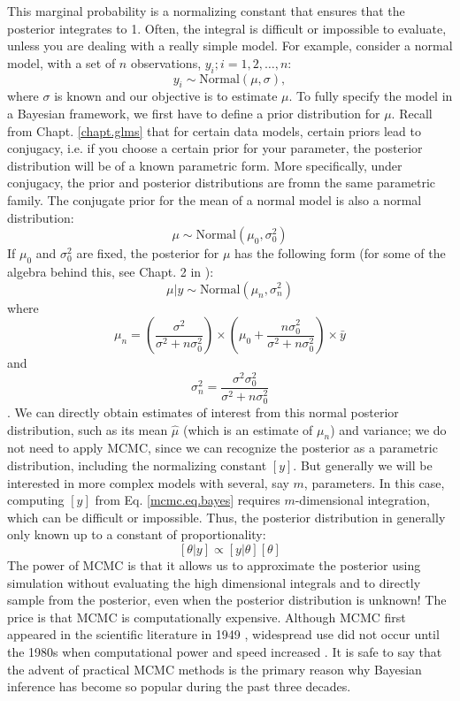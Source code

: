 This marginal probability is a normalizing constant that ensures that
the posterior integrates to 1. Often, the
integral is difficult or impossible to evaluate, unless you are
dealing with a really simple model.  For example, consider
a normal model, with a set of $n$ observations, $y_{i};
i=1,2,\ldots,n$:
\[
 y_{i} \sim \mbox{Normal}(\mu, \sigma),
\]
where $\sigma$ is known and our objective is to estimate
$\mu$. To fully specify the model in a Bayesian
framework, we first have to define a prior distribution for $\mu$. Recall
from Chapt. \ref{chapt.glms}
that for certain data models, certain priors lead to
conjugacy, i.e. if you choose a certain prior for your parameter,
the posterior distribution will be of a known parametric form. More specifically, under conjugacy, the prior and posterior distributions are fromn the same parametric family. The
conjugate prior for the mean of a normal model is also a normal
distribution:
\[
\mu \sim \mbox{Normal}(\mu_0, \sigma_{0}^{2})
\]
If $\mu_{0}$ and $\sigma_{0}^{2}$ are fixed, the posterior for $\mu$
has the following form (for some of the algebra behind this, see Chapt. 2 in \citet{gelman_etal:2004}):
\begin{equation}
\mu|y \sim \mbox{Normal}(\mu_{n}, \sigma_{n}^{2})
\label{mcmc.eq.mu-posterior}
\end{equation}
where
\[
\mu_{n} = \left( \frac{ \sigma^{2}}  {\sigma^{2}   +n \sigma_{0}^{2}} \right) \times  \left(\mu_0 +      \frac{n  \sigma_{0}^{2}}  {\sigma^{2}   +n \sigma_{0}^{2}} \right) \times\bar{y}
\]
and
\[
 \sigma_{n}^{2} = \frac{\sigma^{2}  \sigma_{0}^{2}} {\sigma^{2} + n \sigma_{0}^{2}}
\].
We can directly obtain estimates of interest from this normal
posterior distribution, such as its mean $\hat{\mu}$ (which is an estimate of $\mu_{n}$) and variance; we
do not need to apply MCMC, since we can recognize the posterior as a
parametric distribution, including the normalizing constant $[y]$.
But generally we will be interested in more complex models with
several, say $m$, parameters. In this case, computing $[y]$ from
Eq. \ref{mcmc.eq.bayes} requires $m$-dimensional integration, which
can be difficult or impossible. Thus, the posterior distribution in
generally only known up to a constant of proportionality:
\[
[\theta|y] \propto [y|\theta]  [\theta]
\]
The power of MCMC is that it allows us to approximate the posterior
using simulation without evaluating the high dimensional integrals and
to directly sample from the posterior, even when the posterior
distribution is unknown! The price is that MCMC is computationally
expensive. Although MCMC first appeared in the scientific literature
in 1949 \citep{metropolis_etal:1949}, widespread use did not occur
until the 1980s when computational power and speed increased
\citep{gelfand_smith:1990}. It is safe to say that the advent of
practical MCMC methods is the primary reason why Bayesian inference
has become so popular during the past three decades.

